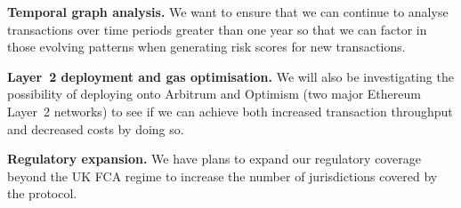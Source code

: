 \documentclass[journal]{IEEEtran}
\begin{document}
\textbf{Temporal graph analysis.} We want to ensure that we can continue to analyse transactions over time periods greater than one year so that we can factor in those evolving patterns when generating risk scores for new transactions.

\textbf{Layer~2 deployment and gas optimisation.} We will also be investigating the possibility of deploying onto Arbitrum and Optimism (two major Ethereum Layer~2 networks) to see if we can achieve both increased transaction throughput and decreased costs by doing so.

\textbf{Regulatory expansion.} We have plans to expand our regulatory coverage beyond the UK FCA regime to increase the number of jurisdictions covered by the protocol.

\end{document}
